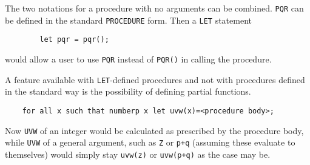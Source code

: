 The two notations for a procedure with no arguments can be combined. \texttt{PQR}
can be defined in the standard \texttt{PROCEDURE} form. Then a \texttt{LET}
statement
\begin{verbatim}
        let pqr = pqr();
\end{verbatim}
would allow a user to use \texttt{PQR} instead of \texttt{PQR()} in calling the
procedure.

A feature available with \texttt{LET}-defined procedures and not with procedures
defined in the standard way is the possibility of defining partial
functions.
\begin{verbatim}
    for all x such that numberp x let uvw(x)=<procedure body>;
\end{verbatim}
Now \texttt{UVW} of an integer would be calculated as prescribed by the procedure
body, while \texttt{UVW} of a general argument, such as \texttt{Z} or \texttt{p+q}
(assuming these evaluate to themselves) would simply stay \texttt{uvw(z)}
or \texttt{uvw(p+q)} as the case may be.

